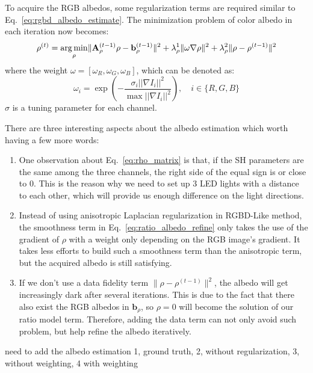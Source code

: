 To acquire the RGB albedos, some regularization terms are required similar to Eq.~\ref{eq:rgbd_albedo_estimate}. The minimization problem of color albedo in each iteration now becomes:
\begin{equation}\label{eq:ratio_albedo_refine}
\rho^{(t)} = \operatorname*{arg\,min}_{\rho} \lVert\mathbf{A}_{\rho}^{(t-1)}\rho - \mathbf{b}_{\rho}^{(t-1)}\rVert^2 + \lambda_{\rho}^1 \lVert \omega \nabla \rho \rVert^2  + \lambda_{\rho}^2 \lVert \rho - \rho^{(t-1)}\rVert^2
\end{equation}
where the weight $\omega = [\omega_R, \omega_G, \omega_B]$, which can be denoted as:
\begin{equation}
\omega_i = \exp(- \frac{\sigma_i ||\nabla I_i||^2}{\max ||\nabla I_i||^2}), \quad i \in \{R,G,B\}
\end{equation}
$\sigma$ is a tuning parameter for each channel.  

There are three interesting aspects about the albedo estimation which worth having a few more words:
\begin{enumerate}
    \item One observation about Eq.~\ref{eq:rho_matrix} is that, if the SH parameters are the same among the three channels, the right side of the equal sign is or close to 0. 
    This is the reason why we need to set up 3 LED lights with a distance to each other, which will provide us enough difference on the light directions.
    \item Instead of using anisotropic Laplacian regularization in RGBD-Like method, the smoothness term in Eq.~\ref{eq:ratio_albedo_refine} only takes the use of the gradient of $\rho$ with a weight only depending on the RGB image's gradient.
    It takes less efforts to build such a smoothness term than the anisotropic term, but the acquired albedo is still satisfying.
    \item If we don't use a data fidelity term $\lVert \rho - \rho^{(t-1)}\rVert^2$, the albedo will get increasingly dark after several iterations. 
    This is due to the fact that there also exist the RGB albedos in $\mathbf{b}_{\rho}$, so $\rho = 0$ will become the solution of our ratio model term.
    Therefore, adding the data term can not only avoid such problem, but help refine the albedo iteratively. 
\end{enumerate}

{\color{red} need to add the albedo estimation 1, ground truth, 2, without regularization, 3, without weighting, 4 with weighting}

